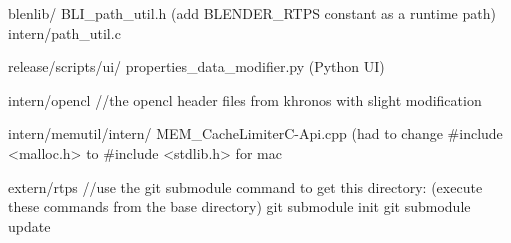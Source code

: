 \begin{cppcode}{0}
    blenlib/
        BLI_path_util.h     (add BLENDER_RTPS constant as a runtime path)
        intern/path_util.c

release/scripts/ui/
    properties_data_modifier.py (Python UI)

intern/opencl
    //the opencl header files from khronos with slight modification

intern/memutil/intern/
    MEM_CacheLimiterC-Api.cpp (had to change #include <malloc.h> to #include <stdlib.h> for mac

extern/rtps
    //use the git submodule command to get this directory: (execute these commands from the base directory)
        git submodule init
        git submodule update





\end{cppcode}

